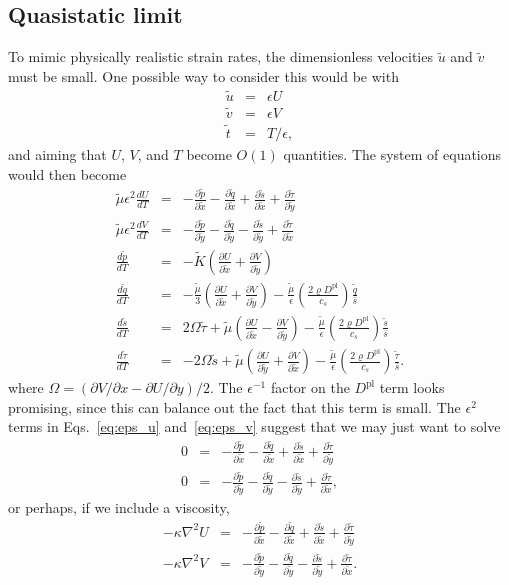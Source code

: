 \documentclass[12pt]{article}
\newcommand{\p}{\partial}
\newcommand{\Dpl}{D^\textrm{pl}}
\newcommand{\tT}{\tilde{t}}
\newcommand{\xT}{\tilde{x}}
\newcommand{\yT}{\tilde{y}}
\newcommand{\uT}{\tilde{u}}
\newcommand{\vT}{\tilde{v}}
\newcommand{\KT}{\tilde{K}}
\newcommand{\pT}{\tilde{p}}
\newcommand{\sT}{\tilde{s}}
\newcommand{\qT}{\tilde{q}}
\newcommand{\tauT}{\tilde{\tau}}
\newcommand{\muT}{\tilde{\mu}}
\newcommand{\prxT}[1]{\frac{\p #1}{\p \xT}}
\newcommand{\pryT}[1]{\frac{\p #1}{\p \yT}}
\newcommand{\bs}{\bar{s}}
\begin{document}
\subsection*{Quasistatic limit}
To mimic physically realistic strain rates, the dimensionless velocities $\uT$
and $\vT$ must be small. One possible way to consider this would be with
\begin{eqnarray*}
\uT &=& \epsilon U \\
\vT &=& \epsilon V \\
\tT &=& T/\epsilon,
\end{eqnarray*}
and aiming that $U$, $V$, and $T$ become $O(1)$ quantities. The system of
equations would then become 
\begin{eqnarray}
  \label{eq:eps_u} \muT \epsilon^2 \frac{dU}{dT}&=&-\prxT{\pT}-\prxT{\qT}+\prxT{\sT}+\pryT{\tauT} \\
  \label{eq:eps_v} \muT \epsilon^2 \frac{dV}{dT}&=&-\pryT{\pT}-\pryT{\qT}-\pryT{\sT}+\prxT{\tauT} \\
  \frac{d\pT}{dT} &=& -\KT \left(\prxT{U} +\pryT{V}\right) \\
  \frac{d\qT}{dT} &=& - \frac{\muT}{3} \left(\prxT{U} +\pryT{V}\right) - \frac{\muT}{\epsilon} \left(\frac{2 \varrho \Dpl}{c_s}\right) \frac{\qT}{\bs} \\
  \frac{d\sT}{dT} &=& 2\Omega \tauT + \muT \left( \prxT{U} - \pryT{V} \right) - \frac{\muT}{\epsilon} \left(\frac{2 \varrho \Dpl}{c_s}\right) \frac{\sT}{\bs} \\
  \label{eq:eps_tau} \frac{d\tauT}{dT} &=& - 2\Omega \sT + \muT \left( \pryT{U} + \prxT{V} \right) - \frac{\muT}{\epsilon} \left(\frac{2 \varrho \Dpl}{c_s}\right) \frac{\tauT}{\bs}.
\end{eqnarray}
where $\Omega= (\p V /\p x - \p U / \p y)/2$. The $\epsilon^{-1}$ factor on the
$\Dpl$ term looks promising, since this can balance out the fact that this term
is small. The $\epsilon^2$ terms in Eqs.~\ref{eq:eps_u} and~\ref{eq:eps_v}
suggest that we may just want to solve
\begin{eqnarray}
  \label{eq:eps_u2} 0&=&-\prxT{\pT}-\prxT{\qT}+\prxT{\sT}+\pryT{\tauT} \\
  \label{eq:eps_v2} 0&=&-\pryT{\pT}-\pryT{\qT}-\pryT{\sT}+\prxT{\tauT},
\end{eqnarray}
or perhaps, if we include a viscosity,
\begin{eqnarray}
  \label{eq:eps_u3} -\kappa \nabla^2 U &=&-\prxT{\pT}-\prxT{\qT}+\prxT{\sT}+\pryT{\tauT}\\
  \label{eq:eps_v3} -\kappa \nabla^2 V &=&-\pryT{\pT}-\pryT{\qT}-\pryT{\sT}+\prxT{\tauT}.
\end{eqnarray}
\end{document}
